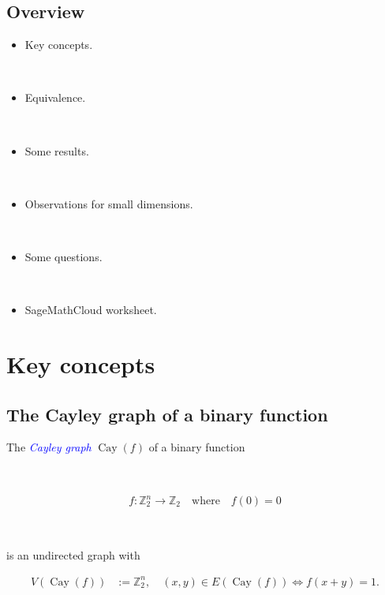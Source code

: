 \documentclass[12pt,a4paper]{article}
\newcommand{\mb}[1]{\mathbb{#1}}
\newcommand{\Z}{\mb{Z}}
\newcommand{\To}{\rightarrow}
\newcommand{\Emph}[1]{\emph{\textcolor{blue}{#1}}}
\newcommand{\Cay}[1]{\operatorname{Cay}\left(#1\right)}
\begin{document}
\subsection*{Overview}
\begin{itemize}
\item
Key concepts.

~

\item
Equivalence.

~

\item
Some results.

~

\item
Observations for small dimensions.

~

\item
Some questions.

~

\item
SageMathCloud worksheet.
\end{itemize}
 

\section{Key concepts}

\subsection*{The Cayley graph of a binary function}
The \Emph{Cayley graph} $\Cay{f}$ of a binary function 

~

\begin{align*}
%
f : \Z_2^n \To \Z_2 \quad \text{where} \quad f(0) = 0 
% 
\end{align*}

~

is 
an undirected graph with 

\begin{align*}
V(\Cay{f}) &:= \Z_2^n, \quad (x,y) \in E(\Cay{f}) \Leftrightarrow f(x+y) = 1.
\end{align*}

~
\end{document}
